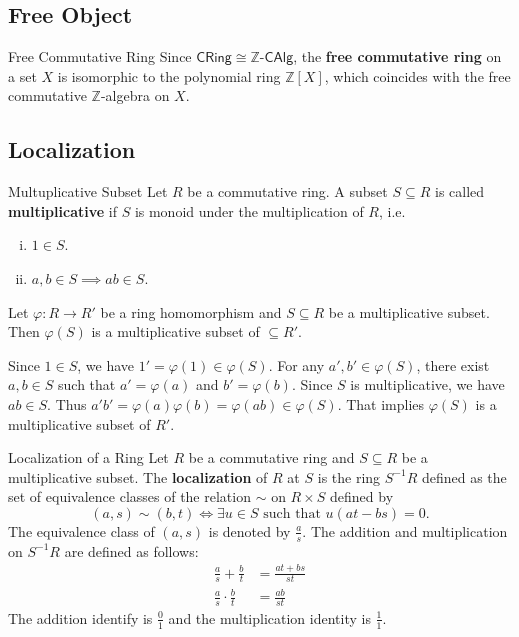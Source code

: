 \subsection{Free Object}
\begin{definition}{Free Commutative Ring}{}
    Since $\mathsf{CRing}\cong \mathbb{Z}\text{-}\mathsf{CAlg}$, the \textbf{free commutative ring} on a set $X$ is isomorphic to the polynomial ring $\mathbb{Z}[X]$, which coincides with the free commutative $\mathbb{Z}$-algebra on $X$.
\end{definition}

\subsection{Localization}
\begin{definition}{Multuplicative Subset}{}
    Let $R$ be a commutative ring. A subset $S\subseteq R$ is called \textbf{multiplicative} if $S$ is monoid under the multiplication of $R$, i.e.
    \begin{enumerate}[(i)]
        \item $1\in S$.
        \item $a,b\in S\implies ab\in S$.
    \end{enumerate}
\end{definition}
\begin{proposition}
    Let $\varphi:R\to R'$ be a ring homomorphism and $S\subseteq R$ be a multiplicative subset. Then $\varphi(S)$ is a multiplicative subset of $\subseteq R'$.
\end{proposition}
\begin{prf}
    Since $1\in S$, we have $1'=\varphi(1)\in \varphi(S)$. For any $a',b'\in \varphi(S)$, there exist $a,b\in S$ such that $a'=\varphi(a)$ and $b'=\varphi(b)$. Since $S$ is multiplicative, we have $ab\in S$. Thus $a'b'=\varphi(a)\varphi(b)=\varphi(ab)\in \varphi(S)$. That implies $\varphi(S)$ is a multiplicative subset of $R'$.
\end{prf}

\begin{definition}{Localization of a Ring}{}
    Let $R$ be a commutative ring and $S\subseteq R$ be a multiplicative subset. The \textbf{localization} of $R$ at $S$ is the ring $S^{-1}R$ defined as the set of equivalence classes of the relation $\sim$ on $R\times S$ defined by $$(a,s)\sim (b,t)\iff \exists u\in S\text{ such that }u(at-bs)=0.$$
    The equivalence class of $(a,s)$ is denoted by $\frac{a}{s}$. The addition and multiplication on $S^{-1}R$ are defined as follows:
    \begin{align*}
        \frac{a}{s}+\frac{b}{t}&=\frac{at+bs}{st}\\
        \frac{a}{s}\cdot\frac{b}{t}&=\frac{ab}{st}
    \end{align*}
    The addition identify is $\frac{0}{1}$ and the multiplication identity is $\frac{1}{1}$.
\end{definition}

